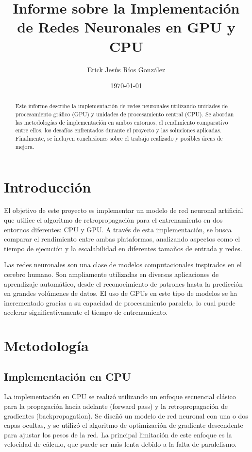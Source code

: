\documentclass[12pt]{article}
\title{Informe sobre la Implementación de Redes Neuronales en GPU y CPU}
\author{Erick Jesús Ríos González}
\date{\today}
\begin{document}
\maketitle

\begin{abstract}
Este informe describe la implementación de redes neuronales utilizando unidades de procesamiento gráfico (GPU) y unidades de procesamiento central (CPU). Se abordan las metodologías de implementación en ambos entornos, el rendimiento comparativo entre ellos, los desafíos enfrentados durante el proyecto y las soluciones aplicadas. Finalmente, se incluyen conclusiones sobre el trabajo realizado y posibles áreas de mejora.
\end{abstract}

\section{Introducción}
El objetivo de este proyecto es implementar un modelo de red neuronal artificial que utilice el algoritmo de retropropagación para el entrenamiento en dos entornos diferentes: CPU y GPU. A través de esta implementación, se busca comparar el rendimiento entre ambas plataformas, analizando aspectos como el tiempo de ejecución y la escalabilidad en diferentes tamaños de entrada y redes.

Las redes neuronales son una clase de modelos computacionales inspirados en el cerebro humano. Son ampliamente utilizadas en diversas aplicaciones de aprendizaje automático, desde el reconocimiento de patrones hasta la predicción en grandes volúmenes de datos. El uso de GPUs en este tipo de modelos se ha incrementado gracias a su capacidad de procesamiento paralelo, lo cual puede acelerar significativamente el tiempo de entrenamiento.

\section{Metodología}
\subsection{Implementación en CPU}
La implementación en CPU se realizó utilizando un enfoque secuencial clásico para la propagación hacia adelante (forward pass) y la retropropagación de gradientes (backpropagation). Se diseñó un modelo de red neuronal con una o dos capas ocultas, y se utilizó el algoritmo de optimización de gradiente descendente para ajustar los pesos de la red. La principal limitación de este enfoque es la velocidad de cálculo, que puede ser más lenta debido a la falta de paralelismo.
\end{document}
